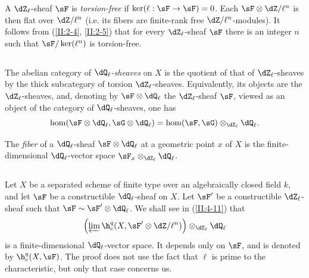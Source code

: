 A $\dZ_\ell$-sheaf $\sF$ is \emph{torsion-free} if
$\ker(\ell:\sF\to\sF) = 0$. Each $\sF\otimes\dZ/\ell^n$ is then flat over
$\dZ/\ell^n$ (i.e. its fibers are finite-rank free
$\dZ/\ell^n$-modules). It follows from (\ref{II:2-4}, \ref{II:2-5}) that for
every $\dZ_\ell$-sheaf $\sF$ there is an integer $n$ such that
$\sF/\ker(\ell^n)$ is torsion-free.






\subsection{}\label{II:2-9}

The abelian category of \emph{$\dQ_\ell$-sheaves} on $X$ is the quotient of
that of $\dZ_\ell$-sheaves by the thick subcategory of torsion
$\dZ_\ell$-sheaves. Equivalently, its objects are the $\dZ_\ell$-sheaves,
and, denoting by $\sF\otimes\dQ_\ell$ the $\dZ_\ell$-sheaf $\sF$, viewed as
an object of the category of $\dQ_\ell$-sheaves, one has
\[
  \hom(\sF\otimes\dQ_\ell,\sG\otimes\dQ_\ell) = \hom(\sF,\sG)\otimes_{\dZ_\ell}\dQ_\ell \text{.}
\]

The \emph{fiber} of a $\dQ_\ell$-sheaf $\sF\otimes\dQ_\ell$ at a geometric
point $x$ of $X$ is the finite-dimensional $\dQ_\ell$-vector space
$\sF_x\otimes_{\dZ_\ell}\dQ_\ell$.






\subsection{}\label{II:2-10}

Let $X$ be a separated scheme of finite type over an algebraically closed
field $k$, and let $\sF$ be a constructible $\dQ_\ell$-sheaf on $X$. Let
$\sF'$ be a constructible $\dZ_\ell$-sheaf such that
$\sF\sim \sF'\otimes\dQ_\ell$. We shall see in
(\ref{II:4-11}) that
\[
  \left(\varprojlim \h_c^q(X,\sF'\otimes \dZ/\ell^n)\right)\otimes_{\dZ_\ell}\dQ_\ell
\]
is a finite-dimensional $\dQ_\ell$-vector space. It depends only on $\sF$,
and is denoted by $\h_c^q(X,\sF)$. The proof does not use the fact that
$\ell$ is prime to the characteristic, but only that case concerns us.






\subsection{}\label{II:2-11}


